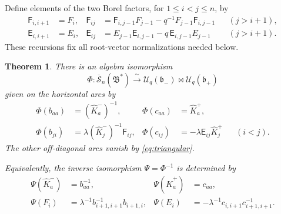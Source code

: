 \documentclass[11pt]{article}
\newtheorem{theorem}{Theorem}[section]
\theoremstyle{remark}
\newcommand{\UU}{\mathcal U_q}
\newcommand{\rSk}{\overline{\mathscr S}_n}
\newcommand{\Bstar}{\mathfrak B^{*}}
\newcommand{\bplus}{\mathfrak b_+}
\newcommand{\bminus}{\mathfrak b_-}
\begin{document}
Define elements of the two Borel factors, for $1\leq i<j\leq n$,
by
\begin{align}
 \mathsf F_{i,i+1}&=F_i,
 &
 \mathsf F_{ij}
   &=\mathsf F_{i,j-1}F_{j-1}
       -q^{-1}F_{j-1}\mathsf F_{i,j-1}
       &&(j>i+1),
 \label{eq:F-roots}\\
 \mathsf E_{i,i+1}&=E_i,
 &
 \mathsf E_{ij}
   &=E_{j-1}\mathsf E_{i,j-1}
       -q\,\mathsf E_{i,j-1}E_{j-1}
       &&(j>i+1).
 \label{eq:E-roots}
\end{align}
These recursions fix all root-vector normalizations needed below.

\begin{theorem}\label{thm:main}
There is an algebra isomorphism
\[
 \Phi:\rSk(\Bstar)\xrightarrow{\ \sim\ }
       \UU(\bminus)\bowtie\UU(\bplus)
\]
given on the horizontal arcs by
\begin{align}
 \Phi(b_{aa})&=(\widehat K_a^-)^{-1},
 &
 \Phi(c_{aa})&=\widehat K_a^+,
 \label{eq:Phi-diagonal}\\
 \Phi(b_{ji})&=\lambda(\widehat K_j^-)^{-1}\mathsf F_{ij},
 &
 \Phi(c_{ij})&=-\lambda\mathsf E_{ij}\widehat K_j^+
       &&(i<j).
 \label{eq:Phi-offdiagonal}
\end{align}
The other off-diagonal arcs vanish by
\eqref{eq:triangular}.

Equivalently, the inverse isomorphism $\Psi=\Phi^{-1}$ is
determined by
\begin{align}
 \Psi(\widehat K_a^-)&=b_{aa}^{-1},
 &
 \Psi(\widehat K_a^+)&=c_{aa},
 \label{eq:Psi-tori}\\
 \Psi(F_i)&=\lambda^{-1}b_{i+1,i+1}^{-1}b_{i+1,i},
 &
 \Psi(E_i)&=-\lambda^{-1}c_{i,i+1}c_{i+1,i+1}^{-1}.
 \label{eq:Psi-EF}
\end{align}
\end{theorem}
\end{document}
